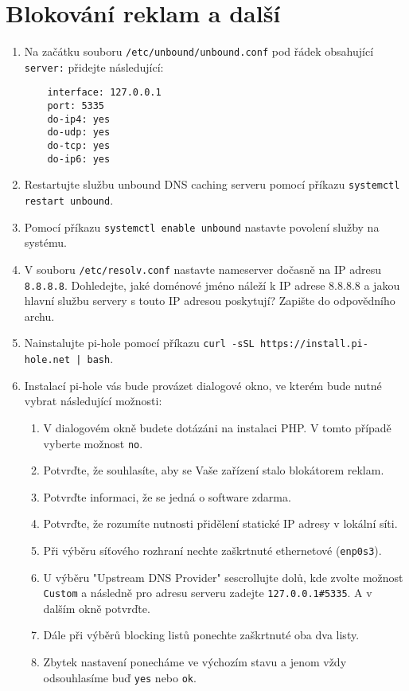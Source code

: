 \section{Blokování reklam a další}
\begin{enumerate}
    \item Na začátku souboru \texttt{/etc/unbound/unbound.conf} pod řádek obsahující \texttt{server:} přidejte následující:
\begin{verbatim}
    interface: 127.0.0.1
    port: 5335
    do-ip4: yes
    do-udp: yes
    do-tcp: yes
    do-ip6: yes
\end{verbatim}
    \item Restartujte službu unbound DNS caching serveru pomocí příkazu \texttt{systemctl restart unbound}.
    \item Pomocí příkazu \texttt{systemctl enable unbound} nastavte povolení služby na systému.
    \item V souboru \texttt{/etc/resolv.conf} nastavte nameserver dočasně na IP adresu \texttt{8.8.8.8}. Dohledejte, jaké doménové jméno náleží k IP adrese 8.8.8.8 a jakou hlavní službu servery s touto IP adresou poskytují? Zapište do odpovědního archu.
    \item Nainstalujte pi-hole pomocí příkazu \texttt{curl -sSL https://install.pi-hole.net | bash}.
    \item Instalací pi-hole vás bude provázet dialogové okno, ve kterém bude nutné vybrat následující možnosti:
    \begin{enumerate}
        \item V dialogovém okně budete dotázáni na instalaci PHP. V tomto případě vyberte možnost \texttt{no}.
		\item Potvrďte, že souhlasíte, aby se Vaše zařízení stalo blokátorem reklam.
		\item Potvrďte informaci, že se jedná o software zdarma.
		\item Potvrďte, že rozumíte nutnosti přidělení statické IP adresy v lokální síti.
        \item Při výběru síťového rozhraní nechte zaškrtnuté ethernetové (\texttt{enp0s3}).
        \item U výběru "Upstream DNS Provider" sescrollujte dolů, kde zvolte možnost \texttt{Custom} a následně pro adresu serveru zadejte \texttt{127.0.0.1\#5335}. A v dalším okně potvrďte.
        \item Dále při výběrů blocking listů ponechte zaškrtnuté oba dva listy.
        \item Zbytek nastavení ponecháme ve výchozím stavu a jenom vždy odsouhlasíme buď \texttt{yes} nebo \texttt{ok}.

\end{enumerate}
\end{enumerate}
